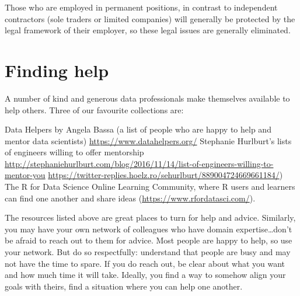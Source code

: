 \documentclass[
]{book}
\begin{document}
Those who are employed in permanent positions, in contrast to independent contractors (sole traders or limited companies) will generally be protected by the legal framework of their employer, so these legal issues are generally eliminated.

\hypertarget{finding-help}{%
\chapter{Finding help}\label{finding-help}}

A number of kind and generous data professionals make themselves available to help others. Three of our favourite collections are:

Data Helpers by Angela Bassa (a list of people who are happy to help and mentor data scientists)
\url{https://www.datahelpers.org/}
Stephanie Hurlburt's lists of engineers willing to offer mentorship
\url{http://stephaniehurlburt.com/blog/2016/11/14/list-of-engineers-willing-to-mentor-you}
\url{https://twitter-replies.hoelz.ro/sehurlburt/889004724669661184/})
The R for Data Science Online Learning Community, where R users and learners can find one another and share ideas (\url{https://www.rfordatasci.com/}).

The resources listed above are great places to turn for help and advice. Similarly, you may have your own network of colleagues who have domain expertise\ldots don't be afraid to reach out to them for advice. Most people are happy to help, so use your network. But do so respectfully: understand that people are busy and may not have the time to spare. If you do reach out, be clear about what you want and how much time it will take. Ideally, you find a way to somehow align your goals with theirs, find a situation where you can help one another.

  
\end{document}
